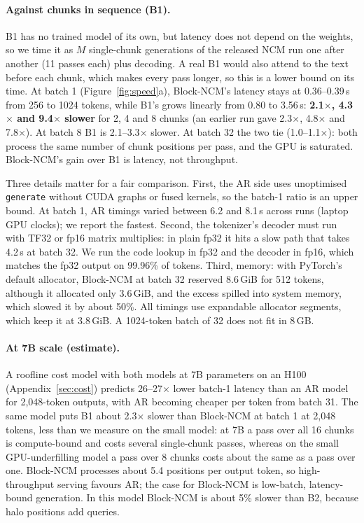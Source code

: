 \documentclass[10pt,twocolumn]{article}
\begin{document}
\paragraph{Against chunks in sequence (B1).} B1 has no trained model of its own, but latency does not depend on the
weights, so we time it as $M$ single-chunk generations of the released NCM run one after another (11 passes each)
plus decoding. A real B1 would also attend to the text before each chunk, which makes every pass longer, so this
is a lower bound on its time. At batch 1 (Figure~\ref{fig:speed}a), Block-NCM's latency stays at 0.36--0.39\,s
from 256 to 1024 tokens, while B1's grows linearly from 0.80 to 3.56\,s: \textbf{2.1$\times$, 4.3$\times$ and
9.4$\times$ slower} for 2, 4 and 8 chunks (an earlier run gave 2.3$\times$, 4.8$\times$ and 7.8$\times$). At
batch 8 B1 is 2.1--3.3$\times$ slower. At batch 32 the two tie (1.0--1.1$\times$): both process the same number
of chunk positions per pass, and the GPU is saturated. Block-NCM's gain over B1 is latency, not throughput.

Three details matter for a fair comparison. First, the AR side uses unoptimised \texttt{generate} without CUDA
graphs or fused kernels, so the batch-1 ratio is an upper bound. At batch 1, AR timings varied between 6.2 and
8.1\,s across runs (laptop GPU clocks); we report the fastest. Second, the tokenizer's decoder must run with TF32 or fp16 matrix multiplies: in plain fp32 it hits a slow
path that takes 4.2\,s at batch 32. We run the code lookup in fp32 and the decoder in fp16, which matches the fp32
output on 99.96\% of tokens. Third, memory: with PyTorch's default allocator, Block-NCM at batch 32 reserved
8.6\,GiB for 512 tokens, although it allocated only 3.6\,GiB, and the excess spilled into system memory, which
slowed it by about 50\%. All timings use expandable allocator segments, which keep it at 3.8\,GiB. A 1024-token
batch of 32 does not fit in 8\,GB.

\paragraph{At 7B scale (estimate).} A roofline cost model with both models at 7B parameters on an H100
(Appendix~\ref{sec:cost}) predicts 26--27$\times$ lower batch-1 latency than an AR model for 2,048-token outputs,
with AR becoming cheaper per token from batch 31. The same model puts B1 about 2.3$\times$ slower than Block-NCM at
batch 1 at 2,048 tokens, less than we measure on the small model: at 7B a pass over all 16 chunks is compute-bound
and costs several single-chunk passes, whereas on the small GPU-underfilling model a pass over 8 chunks costs
about the same as a pass over one. Block-NCM processes about 5.4 positions per output token, so
high-throughput serving favours AR; the case for Block-NCM is low-batch, latency-bound generation. In this model
Block-NCM is about 5\% slower than B2, because halo positions add queries.
\end{document}
